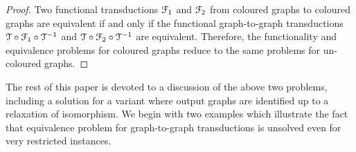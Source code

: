 \begin{proof}
    Two functional \mso transductions ${\mathcal F}_1$ and ${\mathcal F}_2$  from coloured graphs to coloured graphs are equivalent if and only if the functional graph-to-graph \mso transductions  ${\mathcal T} \circ {\mathcal F}_1 \circ {\mathcal T}^{-1}$ and ${\mathcal T} \circ {\mathcal F}_2 \circ {\mathcal T}^{-1}$ are equivalent. 
     Therefore, the functionality and equivalence problems for coloured graphs reduce to the same problems for un-coloured graphs.
\end{proof}

The rest of this paper is devoted to a discussion of the above two problems, including a solution for a variant where output graphs are identified up to a relaxation of isomorphism.
We begin with two examples which illustrate the fact that equivalence problem for graph-to-graph transductions is unsolved even for very restricted instances.

